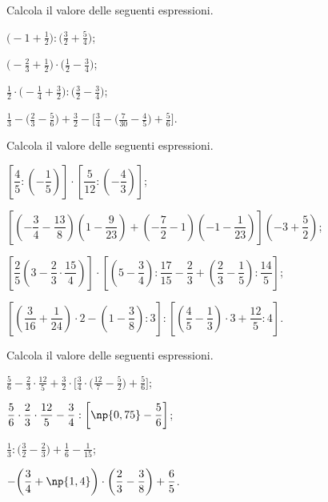 \begin{esercizio}[\Ast]
 \label{ese:3.132}
 Calcola il valore delle seguenti espressioni.
\begin{enumeratea}
\spazielenx
\item $\displaystyle{\bigg(-1+\frac{1}{2}\bigg):\bigg(\frac{3}{2}+\frac{5}{4}\bigg)}$;
\item $\displaystyle{\bigg(-{\frac{2}{3}}+\frac{1}{2}\bigg)\cdot\bigg(\frac{1}{2}-\frac{3}{4}\bigg)}$;
\item $\displaystyle{\frac{1}{2}\cdot\bigg(-{\frac{1}{4}}+\frac{3}{2}\bigg):\bigg(\frac{3}{2}-\frac{3}{4}\bigg)}$;
\item $\displaystyle{\frac{1}{3}-\bigg(\frac{2}{3}-\frac{5}{6}\bigg)+\frac{3}{2}-\bigg[\frac{3}{4}-\bigg(\frac{7}{30}%
-\frac{4}{5}\bigg)+\frac{5}{6}\bigg]}$.
\end{enumeratea}
\end{esercizio}

\begin{esercizio}[\Ast]
 \label{ese:3.133}
 Calcola il valore delle seguenti espressioni.
\begin{enumeratea}
\spazielenx
\item $\left[\dfrac{4}{5}:\left(-\dfrac{1}{5}\right)\right]\cdot\left[\dfrac{5}{12}:\left(-\dfrac{4}{3}\right)\right]$;
\item $\left[\left(-\dfrac{3}{4}-\dfrac{13}{8}\right)\left(1-\dfrac{9}{23}\right)+\left(-\dfrac{7}{2}-1\right)\left(-1-\dfrac{1}{23}\right)\right]\left(-3+\dfrac{5}{2}\right)$;
\item $\left[\dfrac{2}{5}\left(3-\dfrac{2}{3}\cdot\dfrac{15}{4}\right)\right]\cdot\left[\left(5-\dfrac{3}{4}\right):\dfrac{17}{15}-\dfrac{2}{3}+\left(\dfrac{2}{3}-\dfrac{1}{5}\right):\dfrac{14}{5}\right]$;
\item $\left[\left(\dfrac{3}{16}+\dfrac{1}{24}\right)\cdot 2-\left(1-\dfrac{3}{8}\right):3\right]:\left[\left(\dfrac{4}{5}-\dfrac{1}{3}\right)\cdot 3+\dfrac{12}{5}:4\right]$.
\end{enumeratea}
\end{esercizio}

\begin{esercizio}[\Ast]
 \label{ese:3.134}
 Calcola il valore delle seguenti espressioni.
\begin{enumeratea}
\spazielenx
\item $\displaystyle{\frac{5}{6}-\frac{2}{3}\cdot\frac{12}{5}+\frac{3}{2}\cdot\bigg[\frac{3}{4}\cdot%
\bigg(\frac{12}{7}-\frac{5}{2}\bigg)+\frac{5}{6}\bigg]}$;
\item $\displaystyle{\frac{5}{6}\cdot{\frac{2}{3}}\cdot\frac{12}{5}-\frac{3}{4}:\bigg[%
\np{0,75}-\frac{5}{6}\bigg]}$;
\item $\displaystyle{\frac{1}{3}:\bigg(\frac{3}{2}-\frac{2}{3}\bigg)+\frac{1}{6}-\frac{1}{15}}$;
\item $\displaystyle{-\bigg(\frac{3}{4}+\np{1,4}\bigg)\cdot\bigg(\frac{2}{3}-\frac{3}{8}\bigg)+\frac{6}{5}}$.
\end{enumeratea}
\end{esercizio}

